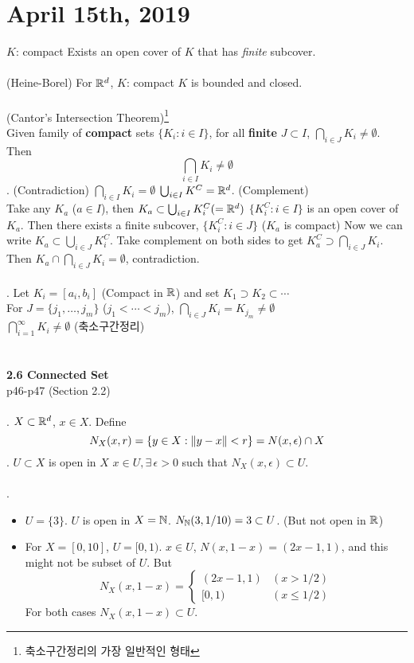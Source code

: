 \section*{April 15th, 2019}
$K$: compact \miff Exists an open cover of $ K $ that has \textit{finite} subcover.\\
\\
 (Heine-Borel) For $\mathbb{R}^d$, $K$: compact \miff $K$ is bounded and closed.\\
\\
 (Cantor's Intersection Theorem)\footnote{축소구간정리의 가장 일반적인 형태}\\
Given family of \textbf{compact} sets $\{K_i:i\in I\}$, for all \textbf{finite} $ J \subset I$, $\bigcap_{i\in J} K_i\neq \emptyset$. Then $$\bigcap_{i\in I} K_i\neq \emptyset$$
\pf. (Contradiction) $\bigcap_{i\in I} K_i = \emptyset$ \mimp $\bigcup_{i\in I} K^C = \mathbb{R}^d$. (Complement)\\
Take any $K_a$ ($a\in I$), then $K_a \subset \bigcup_{i\in I} K_i^C(=\mathbb{R}^d)$ \mimp $\{ K_i^C: i\in I\}$ is an open cover of $K_a$. Then there exists a finite subcover, $\{K_i^C: i\in J \}$ ($K_a$ is compact) Now we can write $K_a\subset \bigcup_{i\in J} K_i^C$. Take complement on both sides to get $K_a^C\supset \bigcap_{i\in J}K_i$. Then $K_a\cap \bigcap_{i\in J} K_i = \emptyset$, contradiction.\\
\\
\rmk. Let $K_i = [a_i, b_i]$ (Compact in $\mathbb{R}$) and set $K_1\supset K_2\subset \cdots$\\
\mimp For $J = \{j_1, \dots, j_m\}$ ($j_1 < \cdots < j_m$), $\bigcap_{i\in J} K_i = K_{j_m} \neq \emptyset$\\
\mimp $\bigcap_{i=1}^\infty K_i \neq \emptyset$ (축소구간정리)\\
\\
\\
\textbf{2.6 Connected Set}\\
p46-p47 (Section 2.2)\\
\\
. $ X\subset \mathbb{R}^d $, $x\in X$. Define $$N_X(x, r) = \{y\in X: \left\lVert y - x\right\rVert < r \} = N(x, \epsilon) \cap X$$
. $U\subset X$ is open in $X$ \miff $x\in U, \exists\, \epsilon > 0$ such that $N_X(x, \epsilon) \subset U$.\\
\\
\ex.
\begin{itemize}
	\item $U = \{3\}$. $U$ is open in $X = \mathbb{N}$. $N_{\mathbb{N}}(3, 1/10) = {3} \subset U$. (But not open in $\mathbb{R}$)
	\item For $X = [0, 10]$, $ U = [0, 1)$.
	$x\in U$, $N(x, 1-x) = (2x - 1, 1)$, and this might not be subset of $U$. But $$N_X(x, 1-x) = \begin{cases}
		(2x-1, 1) & (x > 1/2)\\
		[0, 1) & (x\leq 1/2)
	\end{cases}$$
	For both cases $N_X(x, 1-x) \subset U$.
\end{itemize}
